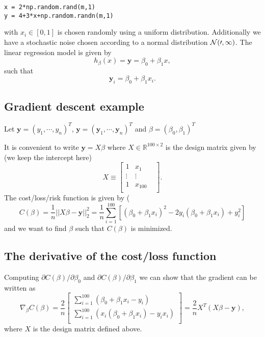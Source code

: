 \documentclass[%
oneside,                 %
final,                   %
10pt]{article}
\begin{document}
\begin{verbatim}
x = 2*np.random.rand(m,1)
y = 4+3*x+np.random.randn(m,1)
\end{verbatim}
with $x_i \in [0,1] $ is chosen randomly using a uniform distribution. Additionally we have a stochastic noise chosen according to a normal distribution $\cal {N}(0,1)$. 
The linear regression model is given by 
\[
h_\beta(x) = \bm{y} = \beta_0 + \beta_1 x,
\] 
such that 
\[
\bm{y}_i = \beta_0 + \beta_1 x_i.
\]

\subsection*{Gradient descent example}

Let $\mathbf{y} = (y_1,\cdots,y_n)^T$, $\mathbf{\bm{y}} = (\bm{y}_1,\cdots,\bm{y}_n)^T$ and $\beta = (\beta_0, \beta_1)^T$

It is convenient to write $\mathbf{\bm{y}} = X\beta$ where $X \in \mathbb{R}^{100 \times 2} $ is the design matrix given by (we keep the intercept here)
\[
X \equiv \begin{bmatrix}
1 & x_1  \\
\vdots & \vdots  \\
1 & x_{100} &  \\
\end{bmatrix}.
\]
The cost/loss/risk function is given by (
\[
C(\beta) = \frac{1}{n}||X\beta-\mathbf{y}||_{2}^{2} = \frac{1}{n}\sum_{i=1}^{100}\left[ (\beta_0 + \beta_1 x_i)^2 - 2 y_i (\beta_0 + \beta_1 x_i) + y_i^2\right] 
\]
and we want to find $\beta$ such that $C(\beta)$ is minimized.

\subsection*{The derivative of the cost/loss function}

Computing $\partial C(\beta) / \partial \beta_0$ and $\partial C(\beta) / \partial \beta_1$ we can show  that the gradient can be written as
\[
\nabla_{\beta} C(\beta) = \frac{2}{n}\begin{bmatrix} \sum_{i=1}^{100} \left(\beta_0+\beta_1x_i-y_i\right) \\
\sum_{i=1}^{100}\left( x_i (\beta_0+\beta_1x_i)-y_ix_i\right) \\
\end{bmatrix} = \frac{2}{n}X^T(X\beta - \mathbf{y}), 
\]
where $X$ is the design matrix defined above.
\end{document}
